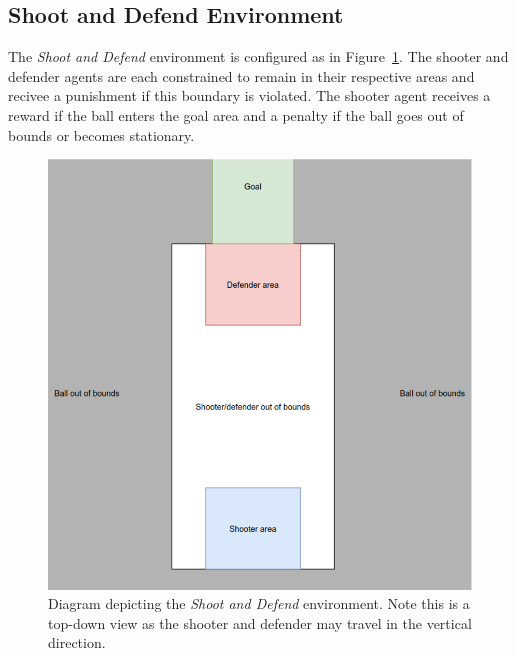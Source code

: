 \documentclass{article}
\begin{document}
\subsection{Shoot and Defend Environment}
The \textit{Shoot and Defend} environment is configured as in Figure~\ref{fig:sad_env}. 
The shooter and defender agents are each constrained to remain in their respective areas and recivee a punishment if this boundary is violated. 
The shooter agent receives a reward if the ball enters the goal area and a penalty if the ball goes out of bounds or becomes stationary. 

\begin{figure}
  \includegraphics[width=\linewidth]{imgs/ShootAndDefend_env}
  \caption{Diagram depicting the \textit{Shoot and Defend} environment. Note this is a top-down view as the shooter and defender may travel in the vertical direction.}
  \label{fig:sad_env}
\end{figure}


\newpage


\end{document}

